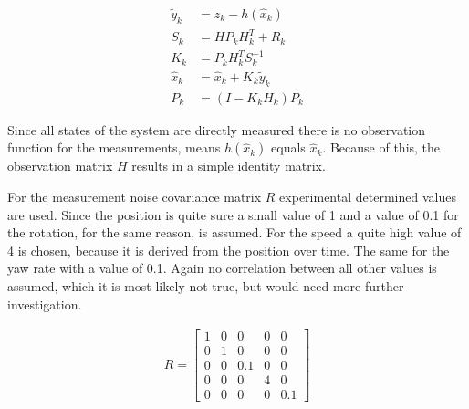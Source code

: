 \documentclass[11pt,oneside,openright]{mpreport}
\begin{document}
\begin{align*}
\tilde{y}_k &= z_k -h(\hat{x}_{k})\\
S_k &= H P_k H^T_k + R_k\\
K_k &= P_k H^T_k S_k^{-1}\\
\hat{x}_k &= \hat{x}_k + K_k \tilde{y}_k\\
P_k &= (I - K_k H_k) P_k
\end{align*}


Since all states of the system are directly measured there is no observation function for the measurements, means 
$h(\hat{x}_k)$ equals $\hat{x}_k$. Because of this, the observation matrix $H$ results in a simple identity matrix.

For the measurement noise covariance matrix $R$ experimental determined values are used. Since the position is quite sure a small value of 1 
and a value of 0.1 for the rotation, for the same reason, is assumed. For the speed a quite high value of 4 is chosen,
because it is derived from the position over time. The same for the yaw rate with a value of 0.1. Again no correlation between all other values is assumed,
which it is most likely not true, but would need more further investigation.

\begin{align*}
R=
\begin{bmatrix}
1 & 0 & 0 & 0 & 0\\
0 & 1 & 0 & 0 & 0\\
0 & 0 & 0.1 & 0 & 0\\
0 & 0 & 0 & 4 & 0\\
0 & 0 & 0 & 0 & 0.1
\end{bmatrix} 
\end{align*}





\end{document}
